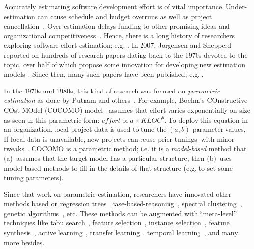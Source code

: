 \documentclass[smallcondesed]{svjour3}
\begin{document}
Accurately estimating software development
effort  is of vital
importance. 
Under-estimation can cause schedule and budget
overruns as well as project
cancellation~\cite{CLCS03}.  Over-estimation delays
funding to other promising ideas and
organizational competitiveness~\cite{koc11a}.
Hence, there is a long history
of researchers exploring software effort estimation; e.g. \cite{wol74,frei79,putnam76,black77,herd77,watson77,jensen83,park88,boehm81,Walkerden1999,shepperd97,jorgensen05,me06d,burgess01}.
In 2007, Jorgensen and Shepperd
reported on hundreds of research papers dating back to the 1970s devoted to
the topic, over half of which propose some innovation
for developing new estimation
models~\cite{jorgensen05}. Since then,
many such papers have been published;
e.g. \cite{lokan06,cora10,minku14,Li2007,Li2009a,keung2008a,keung2008b,keung2008c,koc11b,me12a,me13a,kocaguneli2014transfer}.


In the 1970s and 1980s, this kind of research was focused on
{\em parametric estimation} as done 
by Putnam and
others~\cite{wol74,frei79,black77,herd77,watson77,boehm81}. For example, Boehm's
COnstructive COst MOdel (COCOMO)
model~\cite{boehm81} 
 assumes  that effort varies exponentially on size as seen in this parametric form:
$\mathit{effort} \propto \mathit{a \times KLOC}^b$. To deploy this equation in an organization,
local project data is used to tune the  $(a,b)$ parameter values, If local
data is unavailable, new projects can reuse prior tunings,  with  minor
tweaks~\cite{me04h}. 
COCOMO is a parametric method; i.e. it is a 
{\em model-based} method that (a)~assumes that the target model has a particular structure,
then (b)~uses model-based methods to fill in the details of that structure (e.g. to set some tuning parameters).

 

  


Since that work on parametric estimation, researchers
have innovated other methods based on
regression
trees~\cite{shepperd97}
case-based-reasoning~\cite{shepperd97}, spectral
clustering~\cite{me12d}, genetic
algorithms~\cite{cordero97,burgess01}, etc.  These methods
can be augmented with  ``meta-level'' techniques like tabu search~\cite{cora10}, feature selection~\cite{chen05}, instance selection~\cite{koc11b},
feature synthesis~\cite{me12a}, active learning~\cite{me13a}, transfer learning~\cite{kocaguneli2014transfer}.
temporal learning~\cite{lokan09,minku14}, and many more besides.
\end{document}
